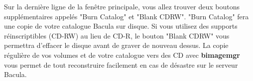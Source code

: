 Sur la dernière ligne de la fenêtre principale, vous allez trouver deux boutons
supplémentaires appelés "Burn Catalog" et "Blank CDRW". "Burn Catalog" fera une
copie de votre catalogue Bacula sur disque. Si vous utilisez des supports
réinscriptibles (CD-RW) au lieu de CD-R, le bouton "Blank CDRW" vous permettra
d'effacer le disque avant de graver de nouveau dessus. La copie régulière de vos
volumes et de votre catalogue vers des CD avec {\bf bimagemgr} vous permet de
tout reconstruire facilement en cas de désastre sur le serveur Bacula.

